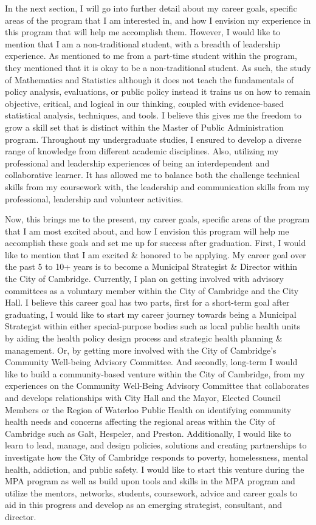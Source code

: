 \documentclass[11pt, a4paper]{awesome-cv}
\begin{document}
\begin{cvletter}
In the next section, I will go into further detail about my career goals, specific areas of the program that I am interested in, and how I envision my experience in this program that will help me accomplish them. However, I would like to mention that I am a non-traditional student, with a breadth of leadership experience. As mentioned to me from a part-time student within the program, they mentioned that it is okay to be a non-traditional student. As such, the study of Mathematics and Statistics although it does not teach the fundamentals of policy analysis, evaluations, or public policy instead it trains us on how to remain objective, critical, and logical in our thinking, coupled with evidence-based statistical analysis, techniques, and tools. I believe this gives me the freedom to grow a skill set that is distinct within the Master of Public Administration program. Throughout my undergraduate studies, I ensured to develop a diverse range of knowledge from different academic disciplines. Also, utilizing my professional and leadership experiences of being an interdependent and collaborative learner. It has allowed me to balance both the challenge technical skills from my coursework with, the leadership and communication skills from my professional, leadership and volunteer activities.

\newpage
Now, this brings me to the present, my career goals, specific areas of the program that I am most excited about, and how I envision this program will help me accomplish these goals and set me up for success after graduation. First, I would like to mention that I am excited \& honored to be applying. My career goal over the past 5 to 10+ years is to become a Municipal Strategist \& Director within the City of Cambridge. Currently, I plan on getting involved with advisory committees as a voluntary member within the City of Cambridge and the City Hall. I believe this career goal has two parts, first for a short-term goal after graduating, I would like to start my career journey towards being a Municipal Strategist within either special-purpose bodies such as local public health units by aiding the health policy design process and strategic health planning \& management. Or, by getting more involved with the City of Cambridge's Community Well-being Advisory Committee. And secondly, long-term I would like to build a community-based venture within the City of Cambridge, from my experiences on the Community Well-Being Advisory Committee that collaborates and develops relationships with City Hall and the Mayor, Elected Council Members or the Region of Waterloo Public Health on identifying community health needs and concerns affecting the regional areas within the City of Cambridge such as Galt, Hespeler, and Preston. Additionally, I would like to learn to lead, manage, and design policies, solutions and creating partnerships to investigate how the City of Cambridge responds to poverty, homelessness, mental health, addiction, and public safety. I would like to start this venture during the MPA program as well as build upon tools and skills in the MPA program and utilize the mentors, networks, students, coursework, advice and career goals to aid in this progress and develop as an emerging strategist, consultant, and director. 



\end{cvletter}
\end{document}
